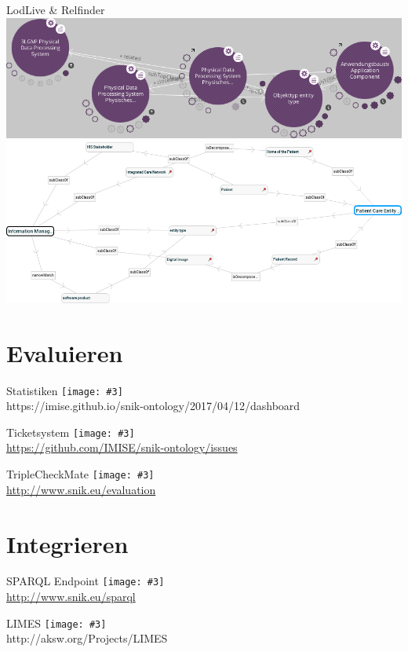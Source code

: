 \documentclass{beamer}
\newcommand{\imageslide}[3][]
{
\begin{frame}{#2}
\centering\texttt{[image: \#3]}
\\#1
\end{frame}
}
\begin{document}
\begin{frame}{LodLive \& Relfinder}
\centering
\includegraphics[width=\textwidth]{../sniktec/img/lodlive.png}\\
\includegraphics[width=\textwidth]{../sniktec/img/relfinder.png}
\end{frame}

\section{Evaluieren}

\imageslide[https://imise.github.io/snik-ontology/2017/04/12/dashboard]{Statistiken}{../sniktec/img/dashboard-medley.png}
\imageslide[\url{https://github.com/IMISE/snik-ontology/issues}]{Ticketsystem}{../sniktec/img/gitissue.png}
\imageslide[\url{http://www.snik.eu/evaluation}]{TripleCheckMate}{../sniktec/img/triplecheckmate.png}

\section{Integrieren}

\imageslide[\url{http://www.snik.eu/sparql}]{SPARQL Endpoint}{../sniktec/img/sparqlresult.png}

\imageslide[http://aksw.org/Projects/LIMES]{LIMES}{../sniktec/img/limes.png}

\end{document}
